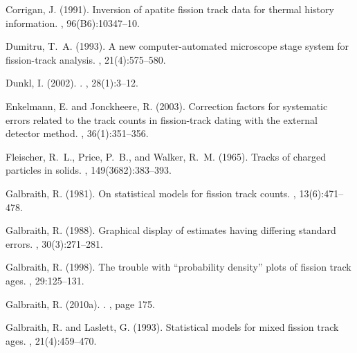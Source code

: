 \documentclass{article}
\begin{document}
\begin{thebibliography}{}
Corrigan, J. (1991).
\newblock Inversion of apatite fission track data for thermal history
  information.
, 96(B6):10347--10.

Dumitru, T.~A. (1993).
\newblock A new computer-automated microscope stage system for fission-track
  analysis.
, 21(4):575--580.

Dunkl, I. (2002).
.
, 28(1):3--12.

Enkelmann, E. and Jonckheere, R. (2003).
\newblock Correction factors for systematic errors related to the track counts
  in fission-track dating with the external detector method.
, 36(1):351--356.

Fleischer, R.~L., Price, P.~B., and Walker, R.~M. (1965).
\newblock Tracks of charged particles in solids.
, 149(3682):383--393.

Galbraith, R. (1981).
\newblock On statistical models for fission track counts.
, 13(6):471--478.

Galbraith, R. (1988).
\newblock Graphical display of estimates having differing standard errors.
, 30(3):271--281.

Galbraith, R. (1998).
\newblock The trouble with ``probability density'' plots of fission track ages.
, 29:125--131.

Galbraith, R. (2010a).
.
, page 175.

Galbraith, R. and Laslett, G. (1993).
\newblock Statistical models for mixed fission track ages.
, 21(4):459--470.


\end{thebibliography}
\end{document}
